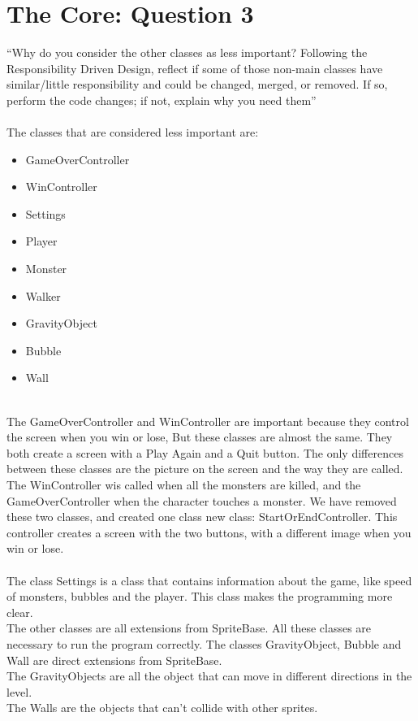 \chapter{The Core: Question 3}
``Why do you consider the other classes as less important? Following the Responsibility Driven Design,
reflect if some of those non-main classes have similar/little responsibility and could be changed,
merged, or removed. If so, perform the code changes; if not, explain why you need them''\\
\\
The classes that are considered less important are:
\begin{itemize}
	\item GameOverController
	\item WinController
	\item Settings
	\item Player
	\item Monster
	\item Walker
	\item GravityObject
	\item Bubble
	\item Wall
\end{itemize}
\\
The GameOverController and WinController are important because they control the screen when you win or lose, But these classes are almost the same. They both create a screen with a Play Again and a Quit button. The only differences between these classes are the picture on the screen and the way they are called. The WinController wis called when all the monsters are killed, and the GameOverController when the character touches a monster. We have removed these two classes, and created one class new class: StartOrEndController. This controller creates a screen with the two buttons, with a different image when you win or lose.\\
\\
The class Settings is a class that contains information about the game, like speed of monsters, bubbles and the player. This class makes the programming more clear.
\\
The other classes are all extensions from SpriteBase. All these classes are necessary to run the program correctly. The classes GravityObject, Bubble and Wall are direct extensions from SpriteBase.\\
The GravityObjects are all the object that can move in different directions in the level.\\
The Walls are the objects that can't collide with other sprites.\\
